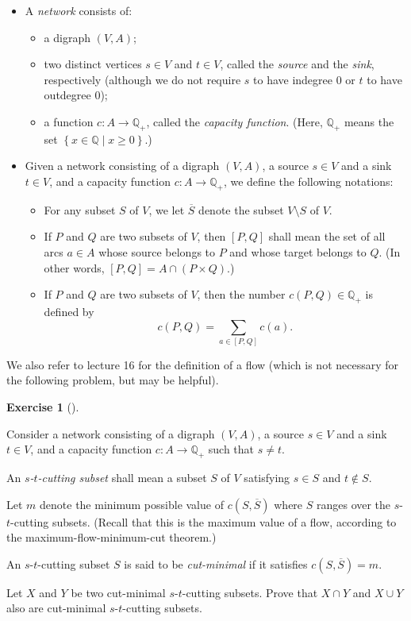 \documentclass[numbers=enddot,12pt,final,onecolumn,notitlepage]{scrartcl}%
\newcounter{exer}
\theoremstyle{definition}
\newtheorem{exmp}[exer]{Exercise}
\newenvironment{exercise}[1][]
{\begin{exmp}[#1]\begin{leftbar}}
{\end{leftbar}\end{exmp}}
\let\sumnonlimits\sum
\renewcommand{\sum}{\sumnonlimits\limits}
\newcommand{\QQ}{\mathbb{Q}}
\newcommand{\set}[1]{\left\{ #1 \right\}}
\newcommand{\tup}[1]{\left( #1 \right)}
\newcommand{\ive}[1]{\left[ #1 \right]}
\begin{document}
\begin{itemize}
\item A \textit{network} consists of:
      \begin{itemize}
      \item a digraph $\tup{V, A}$;
      \item two distinct vertices $s \in V$ and $t \in V$,
            called the \textit{source} and the \textit{sink},
            respectively (although we do not require $s$ to
            have indegree $0$ or $t$ to have outdegree $0$);
      \item a function $c : A \to \QQ_+$, called the
            \textit{capacity function}.
            (Here, $\QQ_+$ means the set
            $\set{ x \in \QQ \mid x \geq 0 }$.)
      \end{itemize}

\item Given a network consisting of a digraph
      $\tup{V, A}$, a source $s \in V$ and a sink $t \in V$,
      and a capacity function $c : A \to \QQ_+$, we define
      the following notations:
      \begin{itemize}
      \item For any subset $S$ of $V$, we let $\overline{S}$
            denote the subset $V \setminus S$ of $V$.
      \item If $P$ and $Q$ are two subsets of $V$, then
            $\ive{P, Q}$ shall mean the set of all arcs
            $a \in A$ whose source belongs to $P$ and whose
            target belongs to $Q$.
            (In other words,
            $\ive{P, Q} = A \cap \tup{P \times Q}$.)
      \item If $P$ and $Q$ are two subsets of $V$, then the
            number $c \tup{P, Q} \in \QQ_+$ is defined by
            \[
            c \tup{P, Q} = \sum_{a \in \ive{P, Q}} c \tup{a} .
            \]
      \end{itemize}
\end{itemize}

We also refer to lecture 16 \cite{lec16} for the definition of a flow
(which is not necessary for the following problem, but may
be helpful).

\begin{exercise} \label{exe.flows-cuts.cut-lattice}
Consider a network consisting of a digraph
$\tup{V, A}$, a source $s \in V$ and a sink $t \in V$,
and a capacity function $c : A \to \QQ_+$
such that $s \neq t$.

An \textit{$s$-$t$-cutting subset} shall mean a subset
$S$ of $V$ satisfying $s \in S$ and $t \notin S$.

Let $m$ denote the minimum possible value of
$c \tup{S, \overline{S}}$ where $S$ ranges over the
$s$-$t$-cutting subsets.
(Recall that this is the maximum value of a
flow, according to the
maximum-flow-minimum-cut theorem.)

An $s$-$t$-cutting subset $S$ is said to be
\textit{cut-minimal} if it satisfies
$c \tup{S, \overline{S}} = m$.

Let $X$ and $Y$ be two cut-minimal $s$-$t$-cutting subsets.
Prove that $X \cap Y$ and $X \cup Y$ also are
cut-minimal $s$-$t$-cutting subsets.
\end{exercise}
\end{document}

